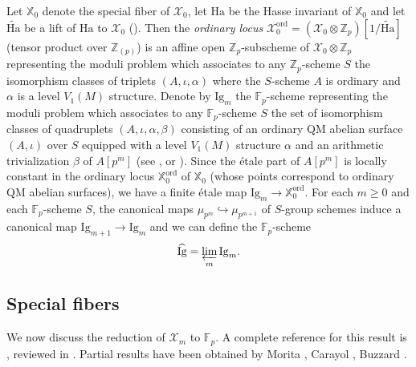 \documentclass[a4paper,11pt]{amsart}
\numberwithin{equation}{section}
\theoremstyle{plain}
\theoremstyle{definition}
\theoremstyle{remark}
\newcommand{\Z}{\mathbb{Z}}
\newcommand{\F}{\mathbb{F}}
\newcommand{\X}{\mathbb{X}}
\newcommand{\ord}{\mathrm{ord}}
\newcommand{\invlim}{\mathop{\varprojlim}\limits}
\begin{document}
Let $\mathbb{X}_0$ denote the special fiber of $\mathcal{X}_0$, let $\mathrm{Ha}$ be the Hasse invariant of $\mathbb{X}_0$ and let $\widetilde{\mathrm{Ha}}$ be a lift of $\mathrm{Ha}$ to $\mathcal{X}_0$ (\cite[\S7]{Kassaei}). Then the \emph{ordinary locus} $\mathcal{X}_0^\ord=(\mathcal{X}_0\otimes\Z_p)[1/\widetilde{\mathrm{Ha}}]$ (tensor product over $\Z_{(p)}$) is an affine open $\Z_p$-subscheme of $\mathcal{X}_0\otimes\Z_p$ representing  the moduli problem which associates to any $\Z_p$-scheme $S$ the isomorphism classes of triplets $(A,\iota,\alpha)$ where the $S$-scheme $A$ is ordinary and $\alpha$ is a level $V_1(M)$ structure. Denote by $\mathrm{Ig}_{m}$ the $\F_p$-scheme representing the moduli problem which associates to any $\F_p$-scheme $S$ the set of isomorphism classes of quadruplets $(A,\iota,\alpha,\beta )$ consisting of an ordinary QM abelian surface $(A,\iota)$ over $S$ equipped with a level $V_1(M)$ structure $\alpha$ and an arithmetic trivialization $\beta$ of $A[p^m]$ (see \cite[Chapter 8]{Hida-padicbook}, \cite[\S2.1]{Hida-control} or \cite[\S2.5]{Burungale}). Since the étale part of $A[p^m]$ is locally constant in the ordinary locus $\X_0^\ord$ of $\X_0$ (whose points correspond to ordinary QM abelian surfaces), we have a finite \'etale map $\mathrm{Ig}_m\rightarrow\X_0^\ord$.
For each $m\geq 0$ and each $\F_p$-scheme $S$, the canonical maps ${\mu}_{p^m}\hookrightarrow {\mu}_{p^{m+1}}$ of $S$-group schemes induce a canonical map $\mathrm{Ig}_{m+1}\rightarrow\mathrm{Ig}_{m}$ and we can define the $\F_p$-scheme \[\widehat{\mathrm{Ig}}=\invlim_m\mathrm{Ig}_{m}.\] 

\subsection{Special fibers}\label{secspecialfibers}
We now discuss the reduction of $\mathcal{X}_m$ to $\F_p$. 
A complete reference for this result is 
\cite[Theorem 81]{Clark}, reviewed in \cite[\S1.1]{Mori1}. Partial 
results have been obtained by Morita \cite{Morita}, Carayol \cite{Carayol-Shimura}, Buzzard \cite{Buz}. 
\end{document}
